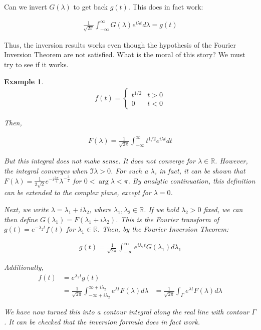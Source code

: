 \documentclass{article}
\newtheorem{ex}{Example}
\theoremstyle{definition}
\def\R{\mathbb{R}}
\begin{document}
Can we invert $G(\lambda)$ to get back $g(t)$. This does in fact work:

\begin{align*}
\frac{1}{\sqrt{2\pi}}\int_{-\infty}^{\infty} G(\lambda) e^{i\lambda t} d\lambda = g(t)
\end{align*}

Thus, the inversion results works even though the hypothesis of the Fourier Inversion Theorem are not satisfied. What is the moral of this story? We must try to see if it works.

\begin{ex}
\begin{align*}
f(t) = \begin{cases}
t^{1/2} &t > 0 \\ 
0 & t < 0
\end{cases}
\end{align*}

Then, 

\begin{align*}
F(\lambda) = \frac{1}{\sqrt{2\pi}}\int_{-\infty}^{\infty} t^{1/2} e^{i\lambda t} dt
\end{align*}

But this integral does not make sense. It does not converge for $\lambda \in \R$. However, the integral converges when $\Im{\lambda} > 0$. For such a $\lambda$, in fact, it can be shown that $F(\lambda) = \frac{1}{2\sqrt{2}} e^{-i\frac{3\pi}{4}} \lambda^{-\frac{3}{2}}$ for $0 < \arg \lambda < \pi$. By analytic continuation, this definition can be extended to the complex plane, except for $\lambda = 0$. 

Next, we write $\lambda = \lambda_1 + i \lambda_2$, where $\lambda_1, \lambda_2 \in \R$. If we hold $\lambda_2 > 0$ fixed, we can then define $G(\lambda_1) = F(\lambda_1 + i \lambda_2)$. This is the Fourier transform of $g(t) = e^{-\lambda_2 t} f(t)$ for $\lambda_1 \in \R$. Then, by the Fourier Inversion Theorem:

\begin{align*}
g(t) = \frac{1}{\sqrt{2\pi}}\int_{-\infty}^{\infty}  e^{i\lambda_1 t} G(\lambda_1) d\lambda_1
\end{align*}

Additionally, 
\begin{align*}
f(t) &= e^{\lambda_2 t} g(t) \\ 
&= \frac{1}{\sqrt{2\pi}}\int_{-\infty+i\lambda_2}^{\infty+i\lambda_2}  e^{\lambda t} F(\lambda) d\lambda
&= \frac{1}{\sqrt{2\pi}}\int_\Gamma  e^{\lambda t} F(\lambda) d\lambda
\end{align*}

We have now turned this into a contour integral along the real line with contour $\Gamma$. It can be checked that the inversion formula does in fact work.

\end{ex}
\end{document}
